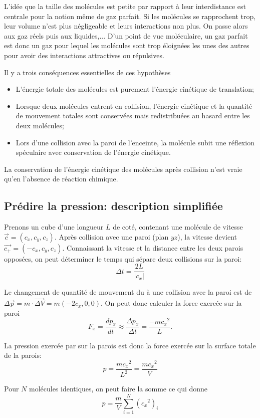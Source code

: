 L'idée que la taille des molécules est petite par rapport à leur interdistance
est centrale pour la notion même de gaz parfait.
Si les molécules se rapprochent trop,
leur volume n'est plus négligeable et leurs interactions non plus.
On passe alors aux gaz réels puis aux liquides,...
D'un point de vue moléculaire,
un gaz parfait est donc un gaz pour lequel les molécules sont
trop éloignées les unes des autres pour avoir des interactions attractives ou
répulsives.

Il y a trois conséquences essentielles de ces hypothèses
\begin{itemize}
  \item L'énergie totale des molécules est purement
    l'énergie cinétique de translation;
  \item Lorsque deux molécules entrent en collision,
    l'énergie cinétique et la quantité de mouvement totales sont
    conservées mais redistribuées au hasard entre les deux molécules;
  \item Lors d'une collision avec la paroi de l'enceinte,
    la molécule subit une réflexion spéculaire avec conservation
    de l'énergie cinétique.
\end{itemize}
La conservation de l'énergie cinétique des molécules après collision
n'est vraie qu'en l'absence de réaction chimique.

\subsection{Prédire la pression: description simplifiée}
Prenons un cube d'une longueur $L$ de coté,
contenant une molécule de vitesse $\vec{c} = (c_x, c_y, c_z)$.
Après collision avec une paroi (plan $yz$),
la vitesse devient $\vec{c_+} = (-c_x, c_y, c_z)$.
Connaissant la vitesse et la distance entre les deux parois opposées,
on peut déterminer le temps qui sépare deux collisions sur la paroi:
\[ \Delta t = \frac{2L}{|c_x|} \]

Le changement de quantité de mouvement du à une collision avec
la paroi est de $\Delta \vec{p} = m \cdot \vec{\Delta V} = m(-2c_x, 0, 0)$.
On peut donc calculer la force exercée sur la paroi
\[ F_x = \frac{dp_x}{dt} \approx
\frac{\Delta p_x}{\Delta t} = \frac{-m{c_x}^2}{L}. \]

La pression exercée par  sur la parois est
donc la force exercée sur la surface totale de la parois:
\[ p = \frac{m{c_x}^2}{L^2} = \frac{m{c_x}^2}{V} \]

Pour $N$ molécules identiques, on peut faire la somme ce qui donne
\[ p = \frac{m}{V} \sum_{i=1}^{N}{({c_x}^2)_i} \]

